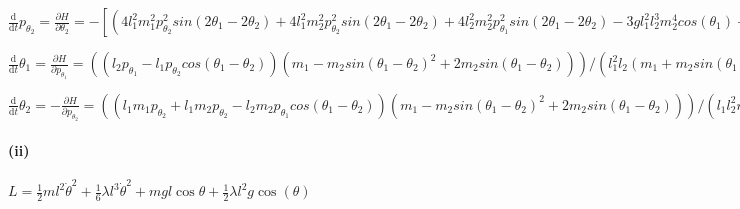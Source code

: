 \documentclass{ctexart}
\begin{document}
$\frac{\mathrm{d}}{\mathrm{d}t} p_{\theta_2}= \frac{\partial H}{\partial \theta_2}=-[(4 l_1^2 m_1^2  p_{\theta_2}^2 sin(2  \theta_1 - 2  \theta_2) + 4 l_1^2 m_2^2  p_{\theta_2}^2 sin(2  \theta_1 - 2  \theta_2) + 4 l_2^2 m_2^2  p_{\theta_1}^2 sin(2  \theta_1 - 2  \theta_2) - 3 g l_1^2 l_2^3 m_2^4 cos( \theta_1) + 3 g l_1^2 l_2^3 m_2^4 cos( \theta_1 - 2  \theta_2) + 8 l_1^2 m_1 m_2  p_{\theta_2}^2 sin(2  \theta_1 - 2  \theta_2) + 4 l_2^2 m_1 m_2  p_{\theta_1}^2 sin(2  \theta_1 - 2  \theta_2) + g l_1^2 l_2^3 m_2^4 cos(3  \theta_1 - 2  \theta_2) - g l_1^2 l_2^3 m_2^4 cos(3  \theta_1 - 4  \theta_2) + 3 l_1 l_2 m_2^2  p_{\theta_1}  p_{\theta_2} + 12 g l_1^2 l_2^3 m_1^2 m_2^2 cos( \theta_1 - 2  \theta_2) - 6 g l_1^2 l_2^3 m_1 m_2^3 sin(2  \theta_1 -  \theta_2) + 6 g l_1^2 l_2^3 m_1 m_2^3 sin(2  \theta_1 - 3  \theta_2) - 4 l_1 l_2 m_2^2  p_{\theta_1}  p_{\theta_2} cos(2  \theta_1 - 2  \theta_2) + l_1 l_2 m_2^2  p_{\theta_1}  p_{\theta_2} cos(4  \theta_1 - 4  \theta_2) + 12 g l_1^2 l_2^3 m_1 m_2^3 sin( \theta_2) + 8 g l_1^2 l_2^3 m_1^3 m_2 sin( \theta_2) - 12 g l_1^2 l_2^3 m_1^2 m_2^2 cos( \theta_1) - 12 l_1 l_2 m_1 m_2  p_{\theta_1}  p_{\theta_2} - 8 l_1 l_2 m_1^2  p_{\theta_1}  p_{\theta_2} sin( \theta_1 -  \theta_2) - 16 l_1 l_2 m_2^2  p_{\theta_1}  p_{\theta_2} sin( \theta_1 -  \theta_2) + 2 l_1 l_2 m_1 m_2  p_{\theta_1}  p_{\theta_2} sin( \theta_1 -  \theta_2) + 12 l_1 l_2 m_1 m_2  p_{\theta_1}  p_{\theta_2} cos(2  \theta_1 - 2  \theta_2) - 6 l_1 l_2 m_1 m_2  p_{\theta_1}  p_{\theta_2} sin(3  \theta_1 - 3  \theta_2))/(2 l_1^2 l_2^2 (3 m_2^3 sin( \theta_1 -  \theta_2) + 6 m_1 m_2^2 - m_2^3 sin(3  \theta_1 - 3  \theta_2) + 4 m_1^3 - 6 m_1 m_2^2 cos(2  \theta_1 - 2  \theta_2) + 12 m_1^2 m_2 sin( \theta_1 -  \theta_2)))]$

$\frac{\mathrm{d}}{\mathrm{d}t} \theta_1= \frac{\partial H}{\partial p_{\theta_1}}=
((l_2  p_{\theta_1} - l_1  p_{\theta_2} cos( \theta_1 -  \theta_2)) (m_1 - m_2 sin( \theta_1 -  \theta_2)^2 + 2 m_2 sin( \theta_1 -  \theta_2)))/(l_1^2 l_2 (m_1 + m_2 sin( \theta_1 -  \theta_2))^2)
$

$\frac{\mathrm{d}}{\mathrm{d}t} \theta_2= -\frac{\partial H}{\partial p_{\theta_2}}=((l_1 m_1  p_{\theta_2} + l_1 m_2  p_{\theta_2} - l_2 m_2  p_{\theta_1} cos( \theta_1 -  \theta_2)) (m_1 - m_2 sin( \theta_1 -  \theta_2)^2 + 2 m_2 sin( \theta_1 -  \theta_2)))/(l_1 l_2^2 m_2 (m_1 + m_2 sin( \theta_1 -  \theta_2))^2)$

\paragraph{(ii)}
$L=\frac{1}{2}ml^2 \dot{\theta}^2+\frac{1}{6}\lambda l^{3}\dot{\theta}^2+mgl\cos\theta+\frac{1}{2}\lambda l^2 g\cos(\theta)$
\end{document}
